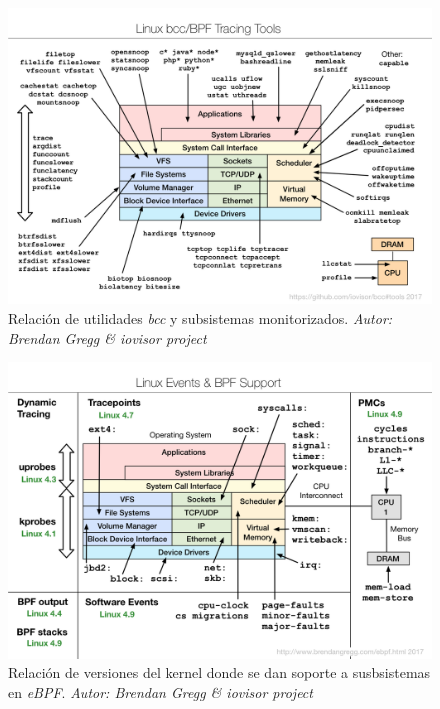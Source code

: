 \begin{figure}[h]
  \centering
    \includegraphics[scale=0.65]{images/bcc_tracing_tools}
  \caption{Relación de utilidades \emph{bcc} y subsistemas monitorizados. \emph{Autor: Brendan Gregg \& iovisor project}}
  \label{fig:bcc-tracing-tools}
\end{figure}

\begin{figure}[h]
  \centering
    \includegraphics[scale=0.65]{images/linux_ebpf_support}
  \caption{Relación de versiones del kernel donde se dan soporte a susbsistemas en \emph{eBPF}. \emph{Autor: Brendan Gregg \& iovisor project}}
  \label{fig:linux_ebpf_support}
\end{figure}

